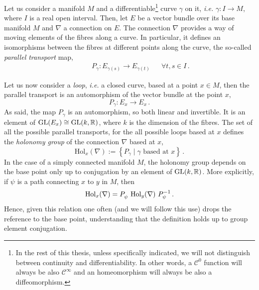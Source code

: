 \documentclass[debug]{phd}
\begin{document}
					
					Let us consider a manifold $M$ and a differentiable\footnote{%
						In the rest of this thesis, unless specifically indicated, we will not distinguish between continuity and differentiability. In other words, a $\mathcal{C}^0$ function will always be also $\mathcal{C}^\infty$ and an homeomorphism will always be also a diffeomorphism.%
						}
					curve $\gamma$ on it, \emph{i.e.} $\gamma : I \rightarrow M$, where $I$ is a real open interval.
					Then, let $E$ be a vector bundle over its base manifold $M$ and $\nabla$ a connection on $E$. 
					The connection $\nabla$ provides a way of moving elements of the fibres along a curve. 
					In particular, it defines an isomorphisms between the fibres at different points along the curve, the so-called \emph{parallel transport} map,
							\begin{align}
								& & & & P_\gamma : E_{\gamma(s)} \rightarrow E_{\gamma(t)} & & \forall t,s \in I\, .
							\end{align}
					
					Let us now consider a \emph{loop}, \emph{i.e.} a closed curve, based at a point $x \in M$, then the parallel transport is an automorphism of the vector bundle at the point $x$,
							\begin{equation}
								P_\gamma : E_{x} \rightarrow E_{x}\, .
							\end{equation}
					As said, the map $P_\gamma$ is an automorphism, so both linear and invertible.
					It is an element of $\mathrm{GL}(E_x) \cong \mathrm{GL}(k, \mathbb{R})$, where $k$ is the dimension of the fibres.
					The set of all the possible parallel transports, for the all possible loops based at $x$ defines the \emph{holonomy group} of the connection $\nabla$ based at $x$,
							\begin{equation*}
								\mathrm{Hol}_x (\nabla) := \left\{ P_\gamma \mid \gamma \text{ based at } x \right\}\, .
							\end{equation*}
					In the case of a simply connected manifold $M$, the holonomy group depends on the base point only up to conjugation by an element of $\mathrm{GL}(k,\mathbb{R})$.
					More explicitly, if $\psi$ is a path connecting $x$ to $y$ in $M$, then
							\begin{equation*}
								\mathrm{Hol}_x (\nabla) = P_\psi^{\vphantom{-1}}\ \mathrm{Hol}_y (\nabla)\ P_\psi^{-1}\, .
							\end{equation*}
					Hence, given this relation one often (and we will follow this use) drops the reference to the base point, understanding that the definition holds up to group element conjugation.
					
\end{document}
